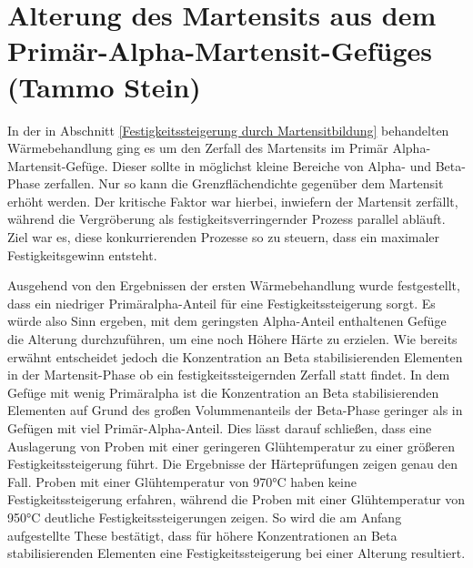\documentclass[a4paper, 11pt]{tubsreprt}
\begin{document}
\section{Alterung des Martensits aus dem Primär-Alpha-Martensit-Gefüges (Tammo Stein)}
In der in Abschnitt \ref{Festigkeitssteigerung durch Martensitbildung} behandelten Wärmebehandlung ging es um den Zerfall des Martensits im Primär Alpha-Martensit-Gefüge. Dieser sollte in möglichst kleine Bereiche von Alpha- und Beta-Phase zerfallen. Nur so kann die Grenzflächendichte gegenüber dem Martensit erhöht werden. Der kritische Faktor war hierbei, inwiefern der Martensit zerfällt, während die Vergröberung als festigkeitsverringernder Prozess parallel abläuft. Ziel war es, diese konkurrierenden Prozesse so zu steuern, dass ein maximaler Festigkeitsgewinn entsteht. 

Ausgehend von den Ergebnissen der ersten Wärmebehandlung wurde festgestellt, dass ein niedriger Primäralpha-Anteil für eine Festigkeitssteigerung sorgt. Es würde also Sinn ergeben, mit dem geringsten Alpha-Anteil enthaltenen Gefüge die Alterung durchzuführen, um eine noch Höhere Härte zu erzielen. Wie bereits erwähnt entscheidet jedoch die Konzentration an Beta stabilisierenden Elementen in der Martensit-Phase ob ein festigkeitssteigernden Zerfall statt findet. In dem Gefüge mit wenig Primäralpha ist die Konzentration an Beta stabilisierenden Elementen auf Grund des großen Volummenanteils der Beta-Phase geringer als in Gefügen mit viel Primär-Alpha-Anteil. Dies lässt darauf schließen, dass eine Auslagerung von Proben mit einer geringeren Glühtemperatur zu einer größeren Festigkeitssteigerung führt. Die Ergebnisse der Härteprüfungen zeigen genau den Fall. Proben mit einer Glühtemperatur von 970°C haben keine Festigkeitssteigerung erfahren, während die Proben mit einer Glühtemperatur von 950°C deutliche Festigkeitssteigerungen zeigen. So wird die am Anfang aufgestellte These bestätigt, dass für höhere Konzentrationen an Beta stabilisierenden Elementen eine Festigkeitssteigerung bei einer Alterung resultiert. 
\end{document}
